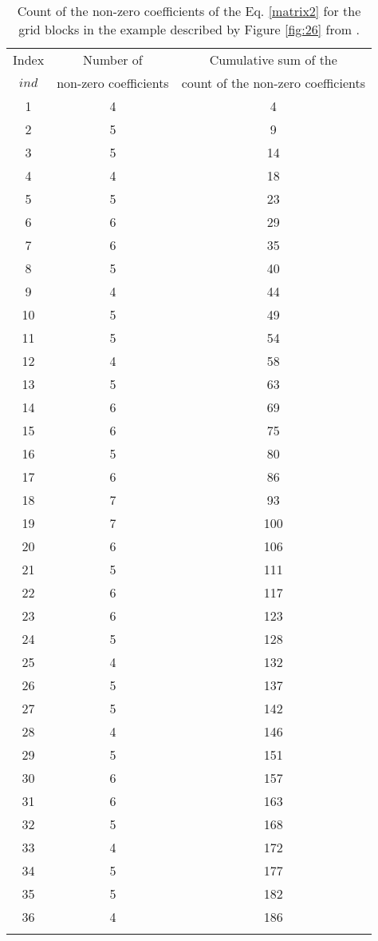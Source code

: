 \begin{center}
	\begin{longtable}[htbp]{c c c}
		\caption{Count of the non-zero coefficients of the Eq. \ref{matrix2} for the grid blocks in the example described by Figure \ref{fig:26} from \cite{Ertekin2001}.}\\
		\toprule
		Index & Number of & Cumulative sum of the\\
		$ind$ &	non-zero coefficients	&	count of the non-zero coefficients\\
		\midrule
		1	&	4	&	4	\\
		2	&	5	&	9	\\
		3	&	5	&	14	\\
		4	&	4	&	18	\\
		5	&	5	&	23	\\
		6	&	6	&	29	\\
		7	&	6	&	35	\\
		8	&	5	&	40	\\
		9	&	4	&	44	\\
		10	&	5	&	49	\\
		11	&	5	&	54	\\
		12	&	4	&	58	\\
		13	&	5	&	63	\\
		14	&	6	&	69	\\
		15	&	6	&	75	\\
		16	&	5	&	80	\\
		17	&	6	&	86	\\
		18	&	7	&	93	\\
		19	&	7	&	100	\\
		20	&	6	&	106	\\
		21	&	5	&	111	\\
		22	&	6	&	117	\\
		23	&	6	&	123	\\
		24	&	5	&	128	\\
		25	&	4	&	132	\\
		26	&	5	&	137	\\
		27	&	5	&	142	\\
		28	&	4	&	146	\\
		29	&	5	&	151	\\
		30	&	6	&	157	\\
		31	&	6	&	163	\\
		32	&	5	&	168	\\
		33	&	4	&	172	\\
		34	&	5	&	177	\\
		35	&	5	&	182	\\
		36	&	4	&	186	\\
		\bottomrule
		\label{table_Ap}
	\end{longtable}
\end{center}
